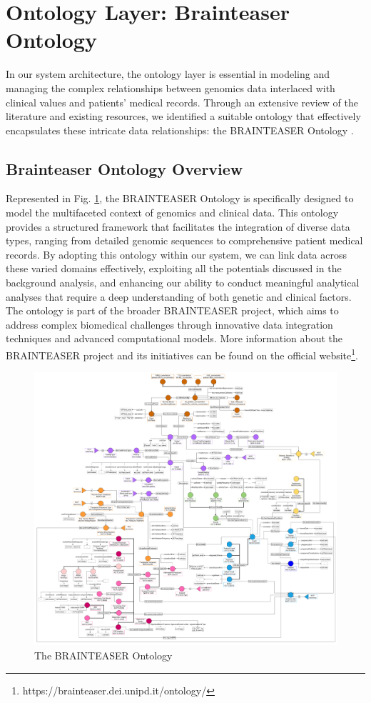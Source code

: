 \section{Ontology Layer: Brainteaser Ontology}
In our system architecture, the ontology layer is essential in modeling and managing the complex relationships between genomics data interlaced with clinical values and patients' medical records. Through an extensive review of the literature and existing resources, we identified a suitable ontology that effectively encapsulates these intricate data relationships: the \ac{BRAINTEASER} Ontology \cite{Faggioli2024BrainTeaser}.
\subsection{Brainteaser Ontology Overview}
Represented in Fig. \ref{fig:bto}, the \ac{BRAINTEASER} Ontology is specifically designed to model the multifaceted context of genomics and clinical data. This ontology provides a structured framework that facilitates the integration of diverse data types, ranging from detailed genomic sequences to comprehensive patient medical records. By adopting this ontology within our system, we can link data across these varied domains effectively, exploiting all the potentials discussed in the background analysis, and enhancing our ability to conduct meaningful analytical analyses that require a deep understanding of both genetic and clinical factors.
The ontology is part of the broader \ac{BRAINTEASER} project, which aims to address complex biomedical challenges through innovative data integration techniques and advanced computational models. More information about the \ac{BRAINTEASER} project and its initiatives can be found on the official website\footnote{https://brainteaser.dei.unipd.it/ontology/}.
\begin{figure}[ht]
  \centering
  \includegraphics[width=15cm]{res/brainteaser.png}
  \caption{The \ac{BRAINTEASER} Ontology}
  \label{fig:bto}
\end{figure}
